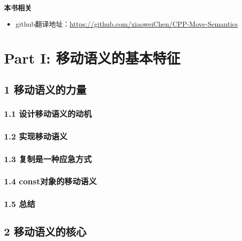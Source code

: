 \documentclass[11pt,a4paper,UTF8]{ctexart}
\begin{document}
	\hspace*{\fill} \\ %
	\noindent\textbf{本书相关}\ \par
	\begin{itemize}
		\item github翻译地址：\href{https://github.com/xiaoweiChen/CPP-Move-Semantics}{https://github.com/xiaoweiChen/CPP-Move-Semantics}
	\end{itemize}
	\newpage
	
	\tableofcontents
	\newpage
	
	\pagestyle{empty}
	
	

	\section{Part I: 移动语义的基本特征}
	
	\subsection{1 移动语义的力量}
	
		\subsubsection{1.1 设计移动语义的动机}
		
		\subsubsection{1.2 实现移动语义}
		
		\subsubsection{1.3 复制是一种应急方式}
		
		\subsubsection{1.4 const对象的移动语义}
		
		\subsubsection{1.5 总结}
		
	\subsection{2 移动语义的核心}
	
\end{document}

